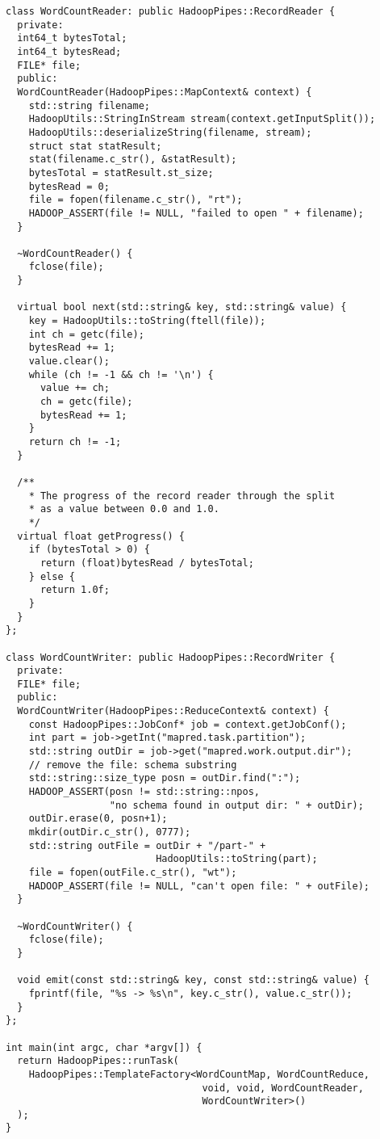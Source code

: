 \documentclass[a4paper, 12pt]{article}
\begin{document}
\begin{appendices}
\begin{lstlisting}[style=cpp]
class WordCountReader: public HadoopPipes::RecordReader {
  private:
  int64_t bytesTotal;
  int64_t bytesRead;
  FILE* file;
  public:
  WordCountReader(HadoopPipes::MapContext& context) {
    std::string filename;
    HadoopUtils::StringInStream stream(context.getInputSplit());
    HadoopUtils::deserializeString(filename, stream);
    struct stat statResult;
    stat(filename.c_str(), &statResult);
    bytesTotal = statResult.st_size;
    bytesRead = 0;
    file = fopen(filename.c_str(), "rt");
    HADOOP_ASSERT(file != NULL, "failed to open " + filename);
  }

  ~WordCountReader() {
    fclose(file);
  }

  virtual bool next(std::string& key, std::string& value) {
    key = HadoopUtils::toString(ftell(file));
    int ch = getc(file);
    bytesRead += 1;
    value.clear();
    while (ch != -1 && ch != '\n') {
      value += ch;
      ch = getc(file);
      bytesRead += 1;
    }
    return ch != -1;
  }

  /**
    * The progress of the record reader through the split
    * as a value between 0.0 and 1.0.
    */
  virtual float getProgress() {
    if (bytesTotal > 0) {
      return (float)bytesRead / bytesTotal;
    } else {
      return 1.0f;
    }
  }
};

class WordCountWriter: public HadoopPipes::RecordWriter {
  private:
  FILE* file;
  public:
  WordCountWriter(HadoopPipes::ReduceContext& context) {
    const HadoopPipes::JobConf* job = context.getJobConf();
    int part = job->getInt("mapred.task.partition");
    std::string outDir = job->get("mapred.work.output.dir");
    // remove the file: schema substring
    std::string::size_type posn = outDir.find(":");
    HADOOP_ASSERT(posn != std::string::npos, 
                  "no schema found in output dir: " + outDir);
    outDir.erase(0, posn+1);
    mkdir(outDir.c_str(), 0777);
    std::string outFile = outDir + "/part-" +
                          HadoopUtils::toString(part);
    file = fopen(outFile.c_str(), "wt");
    HADOOP_ASSERT(file != NULL, "can't open file: " + outFile);
  }

  ~WordCountWriter() {
    fclose(file);
  }

  void emit(const std::string& key, const std::string& value) {
    fprintf(file, "%s -> %s\n", key.c_str(), value.c_str());
  }
};

int main(int argc, char *argv[]) {
  return HadoopPipes::runTask(
    HadoopPipes::TemplateFactory<WordCountMap, WordCountReduce,
                                  void, void, WordCountReader,
                                  WordCountWriter>()
  );
}
\end{lstlisting}


\end{appendices}
\end{document}
